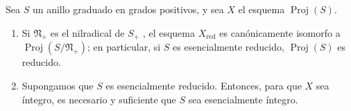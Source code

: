 \documentclass[oneside,10pt]{amsart}
\let\EGAOriginalLabel\label
\renewcommand{\label}[1]{\phantomsection\EGAOriginalLabel{#1}}
\begin{document}
\begin{proposition}[2.4.4]
\label{II.2.4.4-fr}
Sea $S$ un anillo graduado en grados positivos, y sea $X$ el esquema $\operatorname{Proj}(S)$.
\begin{enumerate}
  \item[\rm(i)] Si $\mathfrak{N}_+$ es el nilradical de $S_+$ , el esquema $X_{\mathrm{red}}$ es canónicamente isomorfo a $\operatorname{Proj}(S/\mathfrak{N}_+)$; en particular, si $S$ es esencialmente reducido, $\operatorname{Proj}(S)$ es reducido.
  \item[\rm(ii)] Supongamos que $S$ es esencialmente reducido. Entonces, para que $X$ sea íntegro, es necesario y suficiente que $S$ sea esencialmente íntegro.
\end{enumerate}
\end{proposition}
\end{document}

